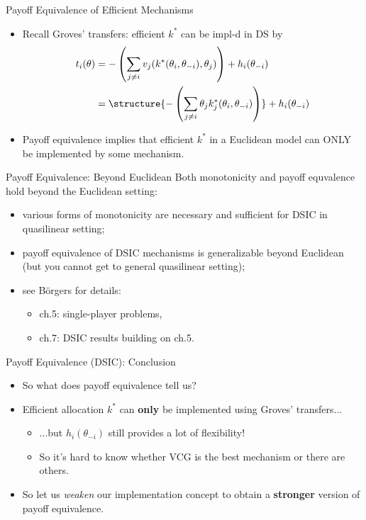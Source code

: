 \documentclass[english,10pt
,aspectratio=169
,handout
]{beamer}
\begin{document}
\begin{frame}{Payoff Equivalence of Efficient Mechanisms}
\begin{itemize}
	\item Recall Groves' transfers: efficient $k^*$ can be impl-d in DS by
	\vspace{-0.5em}\begin{align*}
		t_{i}(\theta) &= -\left(\sum_{j\neq i} v_{j}(k^*(\theta_i, \theta_{-i}), \theta_{j}) \right) + h_{i}(\theta_{-i})
		\\ &= \structure{-\left(\sum_{j\neq i} \theta_j k_j^*(\theta_i, \theta_{-i}) \right)} + h_{i}(\theta_{-i})
	\end{align*}
	
	\pause
	\item Payoff equivalence implies that \alert{efficient} $k^*$ in a \alert{Euclidean} model can \alert{ONLY} be implemented by some  mechanism.
\end{itemize}
\end{frame}


\begin{frame}{Payoff Equivalence: Beyond Euclidean}
	Both monotonicity and payoff equvalence hold beyond the Euclidean setting:
	\begin{itemize}
		\item various forms of \alert{monotonicity} are necessary and sufficient for DSIC in quasilinear setting;
		\item \alert{payoff equivalence} of DSIC mechanisms is generalizable beyond Euclidean (but you cannot get to general quasilinear setting);
		\item see B{\"o}rgers for details:
		\begin{itemize}
			\item ch.5: single-player problems,
			\item ch.7: DSIC results building on ch.5.
		\end{itemize}
	\end{itemize}
\end{frame}


\begin{frame}{Payoff Equivalence (DSIC): Conclusion}
	\begin{itemize}
		\item So what does payoff equivalence tell us?
		\item Efficient allocation $k^*$ can \textbf{only} be implemented using Groves' transfers...
		\begin{itemize}
			\item ...but $h_i(\theta_{-i})$ still provides a lot of flexibility!
			\item So it's hard to know whether VCG is the best mechanism or there are others.
		\end{itemize}
		\item So let us \emph{weaken} our implementation concept to obtain a \textbf{stronger} version of payoff equivalence.
	\end{itemize}
\end{frame}
\end{document}
